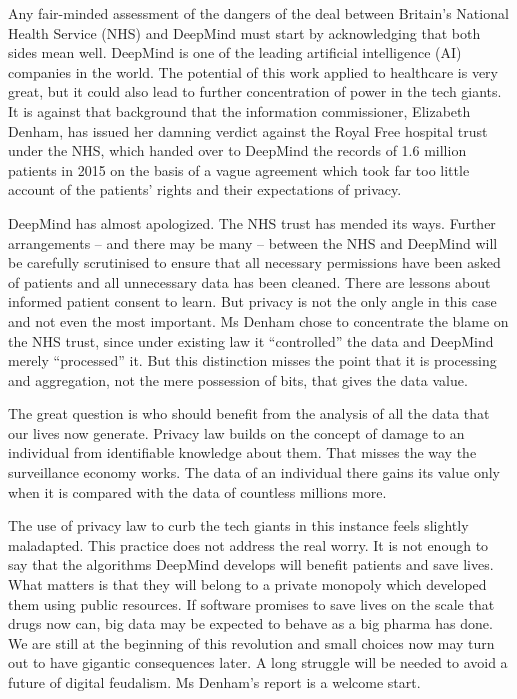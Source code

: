 Any fair-minded assessment of the dangers of the deal between Britain's National Health Service (NHS) and DeepMind must start by acknowledging that both sides mean well. DeepMind is one of the leading artificial intelligence (AI) companies in the world. The potential of this work applied to healthcare is very great, but it could also lead to further concentration of power in the tech giants. It is against that background that the information commissioner, Elizabeth Denham, has issued her damning verdict against the Royal Free hospital trust under the NHS, which handed over to DeepMind the records of 1.6 million patients in 2015 on the basis of a vague agreement which took far too little account of the patients' rights and their expectations of privacy.


DeepMind has almost apologized. The NHS trust has mended its ways. Further arrangements – and there may be many – between the NHS and DeepMind will be carefully scrutinised to ensure that all necessary permissions have been asked of patients and all unnecessary data has been cleaned. There are lessons about informed patient consent to learn. But privacy is not the only angle in this case and not even the most important. Ms Denham chose to concentrate the blame on the NHS trust, since under existing law it ``controlled'' the data and DeepMind merely ``processed'' it. But this distinction misses the point that it is processing and aggregation, not the mere possession of bits, that gives the data value.


The great question is who should benefit from the analysis of all the data that our lives now generate. Privacy law builds on the concept of damage to an individual from identifiable knowledge about them. That misses the way the surveillance economy works. The data of an individual there gains its value only when it is compared with the data of countless millions more.


The use of privacy law to curb the tech giants in this instance feels slightly maladapted. This practice does not address the real worry. It is not enough to say that the algorithms DeepMind develops will benefit patients and save lives. What matters is that they will belong to a private monopoly which developed them using public resources. If software promises to save lives on the scale that drugs now can, big data may be expected to behave as a big pharma has done. We are still at the beginning of this revolution and small choices now may turn out to have gigantic consequences later. A long struggle will be needed to avoid a future of digital feudalism. Ms Denham's report is a welcome start.